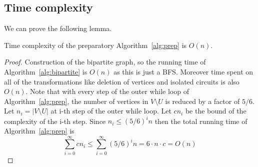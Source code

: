 \subsection{Time complexity}
We can prove the following lemma.
\begin{lemma}
    Time complexity of the preparatory Algorithm~\ref{alg:prep} is $O(n)$.
\end{lemma}
\begin{proof}
 Construction of the 
bipartite graph, so the running time of Algorithm~\ref{alg:bipartite} is $O(n)$ as this is just a BFS. Moreover 
time spent on all of the transformations like deletion of vertices and isolated circuits is also $O(n)$. Note that
with every step of the outer while loop of Algorithm~\ref{alg:prep}, the number of vertices in $V \setminus U$ is 
reduced by a factor of $5/6$. Let $n_i = |V \setminus U|$ at i-th step of the outer while loop. Let $cn_i$ be the bound 
of the complexity of the i-th step. Since $n_i \leq (5/6)^i n$ then the total running time of Algorithm~\ref{alg:prep} is 
$$
\sum_{i=0}^{\infty} cn_i \leq \sum_{i=0}^{\infty} (5/6)^i n = 6 \cdot n \cdot c = O(n)
$$   
\end{proof}






